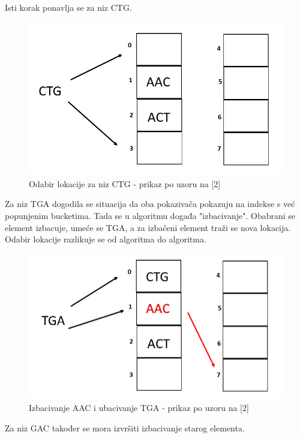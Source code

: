 \documentclass[times, utf8, seminar, numeric]{fer}
\begin{document}
Isti korak ponavlja se za niz CTG.
\begin{figure}[H]
  \centering
  \setlength{\intextsep}{5pt}
  \includegraphics[scale = 0.4]{images/insertion3.png}
  \caption{Odabir lokacije za niz CTG - prikaz po uzoru na [2]}
  \label{fig_insert3}
\end{figure}

Za niz TGA dogodila se situacija da oba pokazivača pokazuju na indekse s već popunjenim bucketima. Tada se u algoritmu događa "izbacivanje". Obabrani se element izbacuje, umeće se TGA, a za izbačeni element traži se nova lokacija. Odabir lokacije razlikuje se od algoritma do algoritma.

\begin{figure}[H]
  \centering
  \setlength{\intextsep}{5pt}
  \includegraphics[scale = 0.4]{images/swap1.png}
  \caption{Izbacivanje AAC i ubacivanje TGA - prikaz po uzoru na [2]}
  \label{fig_swap1}
\end{figure}

Za niz GAC također se mora izvršiti izbacivanje starog elementa. 
\end{document}
